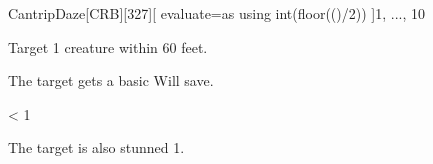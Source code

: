 
\begin{card-collection}{Cantrip}{\level}{Daze}[CRB][327]{\level}[
  evaluate=\level as \dice using int(floor(()/2))
]{1, ..., 10}




Target 1 creature within 60 feet.

The target gets a basic Will save.

\ifnum \dice < 1
\else
{}
\fi

 The target is also stunned 1.
\end{card-collection}%
